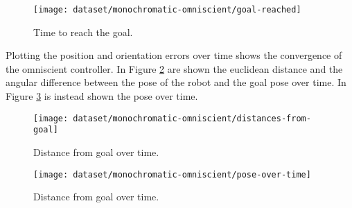 \begin{figure}[htbp]
\centerline{\texttt{[image: dataset/monochromatic-omniscient/goal-reached]}}
	\caption{Time to reach the goal.}
	\label{fig:goal-reached-omniscient}
\end{figure}

Plotting the position and orientation errors over time shows the convergence of 
the omniscient controller. In Figure \ref{fig:distance-from-goal-omniscient} 
are shown the euclidean distance and the angular difference between the pose of 
the robot and the goal pose over time. In Figure \ref{fig:pose-over-time} is 
instead shown the pose over time.

\begin{figure}[htbp]
	
\centerline{\texttt{[image: dataset/monochromatic-omniscient/distances-from-goal]}}
	\caption{Distance from goal over time.}
	\label{fig:distance-from-goal-omniscient}
\end{figure}

\begin{figure}[htbp]
	
\centerline{\texttt{[image: dataset/monochromatic-omniscient/pose-over-time]}}
	\caption{Distance from goal over time.}
	\label{fig:pose-over-time}
\end{figure}
